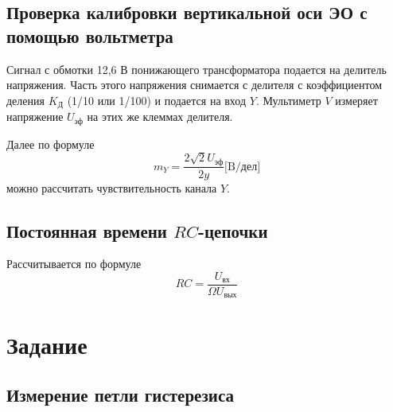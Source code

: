 \documentclass[a4paper, 12pt]{article}%
\begin{document}
\subsection*{Проверка калибровки вертикальной оси ЭО с помощью вольтметра}
Сигнал с обмотки 12,6 В понижающего трансформатора подается на делитель напряжения. Часть этого напряжения снимается с делителя с коэффициентом деления $K_{\text{Д}}$ (1/10 или 1/100) и подается на вход $Y$. Мультиметр $V$ измеряет напряжение $U_{\text{эф}}$ на этих же клеммах делителя.

Далее по формуле 
\begin{equation}
m_Y = \dfrac{2\sqrt{2}U_{\text{эф}}}{2y} \text{[B/дел]}
\end{equation}
можно рассчитать чувствительность канала $Y$.
\subsection*{Постоянная времени $RC$-цепочки}
Рассчитывается по формуле 
\begin{equation}
RC = \dfrac{U_{\text{вх}}}{\Omega U_{\text{вых}}}
\end{equation}

\section*{Задание}
\subsection*{Измерение петли гистерезиса}
\end{document}

